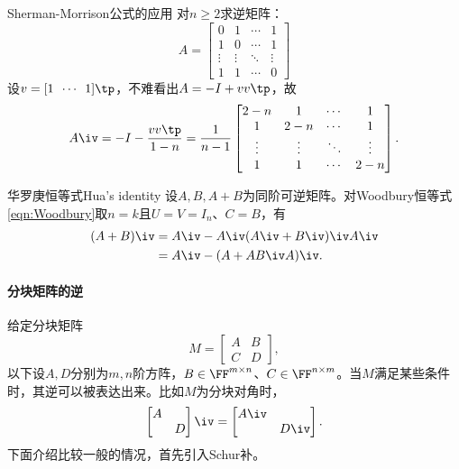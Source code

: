 \begin{example}
	{Sherman-Morrison公式的应用}{}
	对$n\geq2$求逆矩阵：
	\[
		A=\begin{bmatrix}
			0&1&\cdots&1\\
			1&0&\cdots&1\\
			\vdots&\vdots&\ddots&\vdots\\
			1&1&\cdots&0
		\end{bmatrix}
	\]
	设$v=[1\enspace\cdots\enspace 1]\tp$，不难看出$A=-I+vv\tp$，故
	\[
		A\iv=-I-\frac{vv\tp}{1-n}=\frac1{n-1}\begin{bmatrix}
			2-n&1&\cdots&1\\
			1&2-n&\cdots&1\\
			\vdots&\vdots&\ddots&\vdots\\
			1&1&\cdots&2-n
		\end{bmatrix}.
	\]
\end{example}

\begin{theorem}
	{华罗庚恒等式}{Hua's identity}
	设$A,B,A+B$为同阶可逆矩阵。对Woodbury恒等式\eqref{eqn:Woodbury}取$n=k$且$U=V=I_n$、$C=B$，有
		\begin{subequations}
			\begin{align}
				(A+B)\iv&=A\iv-A\iv(A\iv+B\iv)\iv A\iv\\
				\label{eqn:Hua}
				&=A\iv-(A+AB\iv A)\iv.
			\end{align}
		\end{subequations}
\end{theorem}

\paragraph{分块矩阵的逆}

给定分块矩阵
\[
	M=\begin{bmatrix}
		A&B\\C&D
	\end{bmatrix},
\]
以下设$A,D$分别为$m,n$阶方阵，$B\in\FF^{m\times n}$、$C\in\FF^{n\times m}$。当$M$满足某些条件时，其逆可以被表达出来。比如$M$为分块对角时，
\begin{equation}
	\begin{bmatrix}
		A\\ &D
	\end{bmatrix}\iv=\begin{bmatrix}
		A\iv\\ &D\iv
	\end{bmatrix}.
\end{equation}
下面介绍比较一般的情况，首先引入Schur补。

